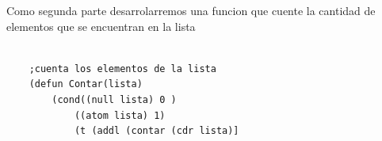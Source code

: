 \documentclass[11pt]{article} %
\begin{document}
Como segunda parte desarrolarremos una funcion que cuente la cantidad de elementos que se encuentran en la lista

\lstset{language=LISP}          %

\begin{lstlisting}[frame=single]
	
	;cuenta los elementos de la lista
	(defun Contar(lista)
		(cond((null lista) 0 )
			((atom lista) 1)
			(t (addl (contar (cdr lista)] 
\end{lstlisting}
\end{document}
